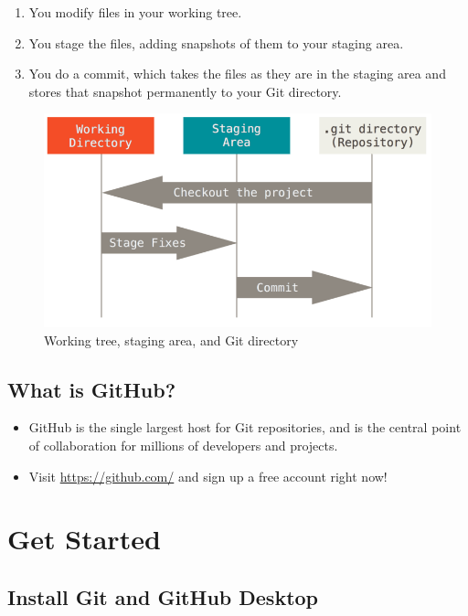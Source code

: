 \documentclass[a4paper,11pt]{article}
\begin{document}
\begin{enumerate}
\item You modify files in your working tree.
\item You stage the files, adding snapshots of them to your staging area.
\item You do a commit, which takes the files as they are in the staging
area and stores that snapshot permanently to your Git directory.
\end{enumerate}

\begin{figure}[htbp]
\centering
\includegraphics[width=.9\linewidth]{img/threestages.png}
\caption{\label{fig:org0db337a}
Working tree, staging area, and Git directory}
\end{figure}

\subsection{What is GitHub?}
\label{sec:orgb2dfedb}

\begin{itemize}
\item GitHub is the single largest host for Git repositories, and is the
central point of collaboration for millions of developers and
projects.

\item Visit \url{https://github.com/} and sign up a free account right now!
\end{itemize}


\section{Get Started}
\label{sec:org42e11c0}

\subsection{Install Git and GitHub Desktop}
\label{sec:org059b3f1}
\end{document}
